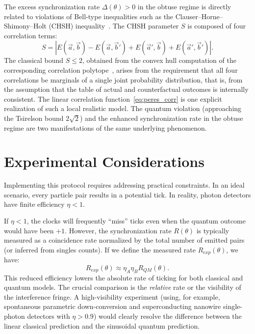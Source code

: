 \documentclass[entropy,article,submit,moreauthors,pdftex]{Definitions/mdpi}
\begin{document}
The excess synchronization rate $\Delta(\theta) > 0$ in the obtuse regime is directly related to violations of Bell-type inequalities such as the Clauser--Horne--Shimony--Holt (CHSH) inequality~\cite{chsh}.
The CHSH parameter $S$ is composed of four correlation terms:
\begin{equation}
S = |E(\vec{a},\vec{b}) - E(\vec{a},\vec{b}') + E(\vec{a}',\vec{b}) + E(\vec{a}',\vec{b}')|.
\end{equation}
The classical bound $S \le 2$, obtained from the convex hull computation of the corresponding correlation polytope~\cite{froissart-81,pitowsky-86}, arises from the requirement that all four correlations be marginals of a single joint probability distribution, that is, from the assumption that the table of actual and counterfactual outcomes is internally consistent.
The linear correlation function~\eqref{eq:peres_corr} is one explicit realization of such a local realistic model.
The quantum violation (approaching the Tsirelson bound $2\sqrt{2}$) and the enhanced synchronization rate in the obtuse regime are two manifestations of the same underlying phenomenon.

\section{Experimental Considerations}

Implementing this protocol requires addressing practical constraints. In an ideal scenario, every particle pair results in a potential tick. In reality, photon detectors have finite efficiency $\eta < 1$.

If $\eta < 1$, the clocks will frequently ``miss'' ticks even when the quantum outcome would have been $+1$. However, the synchronization rate $R(\theta)$ is typically measured as a coincidence rate normalized by the total number of emitted pairs (or inferred from singles counts). If we define the measured rate $R_{exp}(\theta)$, we have:
\begin{equation}
R_{exp}(\theta) \approx \eta_A \eta_B R_{QM}(\theta).
\end{equation}
This reduced efficiency lowers the absolute rate of ticking for both classical and quantum models. The crucial comparison is the \emph{relative} rate or the visibility of the interference fringe. A high-visibility experiment (using, for example, spontaneous parametric down-conversion and superconducting nanowire single-photon detectors with $\eta > 0.9$) would clearly resolve the difference between the linear classical prediction and the sinusoidal quantum prediction.
\end{document}
